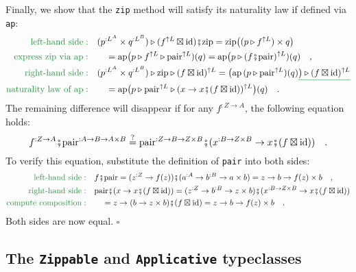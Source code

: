 Finally, we show that the \lstinline!zip! method will satisfy its
naturality law if defined via \lstinline!ap!:
\begin{align*}
{\color{greenunder}\text{left-hand side}:}\quad & (p^{:L^{A}}\times q^{:L^{B}})\triangleright(f^{\uparrow L}\boxtimes\text{id})\bef\text{zip}=\text{zip}\big((p\triangleright f^{\uparrow L})\times q\big)\\
{\color{greenunder}\text{express }\text{zip}\text{ via }\text{ap}:}\quad & \quad=\text{ap}\big(p\triangleright f^{\uparrow L}\triangleright\text{pair}^{\uparrow L})(q)=\text{ap}\big(p\triangleright(f\bef\text{pair})^{\uparrow L})(q)\quad,\\
{\color{greenunder}\text{right-hand side}:}\quad & (p^{:L^{A}}\times q^{:L^{B}})\triangleright\text{zip}\triangleright(f\boxtimes\text{id})^{\uparrow L}=\big(\text{ap}\,(p\triangleright\text{pair}^{\uparrow L})(q)\gunderline{\big)\triangleright(f\boxtimes\text{id})^{\uparrow L}}\\
{\color{greenunder}\text{naturality law of }\text{ap}:}\quad & \quad=\text{ap}\big(p\triangleright\text{pair}^{\uparrow L}\triangleright(x\rightarrow x\bef(f\boxtimes\text{id}))^{\uparrow L}\big)(q)\quad.
\end{align*}
The remaining difference will disappear if for any $f^{:Z\rightarrow A}$,
the following equation holds:
\[
f^{:Z\rightarrow A}\bef\text{pair}^{:A\rightarrow B\rightarrow A\times B}\overset{?}{=}\text{pair}^{:Z\rightarrow B\rightarrow Z\times B}\bef(x^{:B\rightarrow Z\times B}\rightarrow x\bef(f\boxtimes\text{id}))\quad.
\]
To verify this equation, substitute the definition of \lstinline!pair!
into both sides:
\begin{align*}
{\color{greenunder}\text{left-hand side}:}\quad & f\bef\text{pair}=(z^{:Z}\rightarrow f(z))\bef(a^{:A}\rightarrow b^{:B}\rightarrow a\times b)=z\rightarrow b\rightarrow f(z)\times b\quad,\\
{\color{greenunder}\text{right-hand side}:}\quad & \text{pair}\bef(x\rightarrow x\bef(f\boxtimes\text{id}))=(z^{:Z}\rightarrow b^{:B}\rightarrow z\times b)\bef(x^{:B\rightarrow Z\times B}\rightarrow x\bef(f\boxtimes\text{id}))\\
{\color{greenunder}\text{compute composition}:}\quad & \quad=z\rightarrow(b\rightarrow z\times b)\bef(f\boxtimes\text{id})=z\rightarrow b\rightarrow f(z)\times b\quad.
\end{align*}
Both sides are now equal. $\square$

\subsection{The \texttt{Zippable} and \texttt{Applicative} typeclasses\label{subsec:The-Zippable-and-Applicative-typeclass}}

